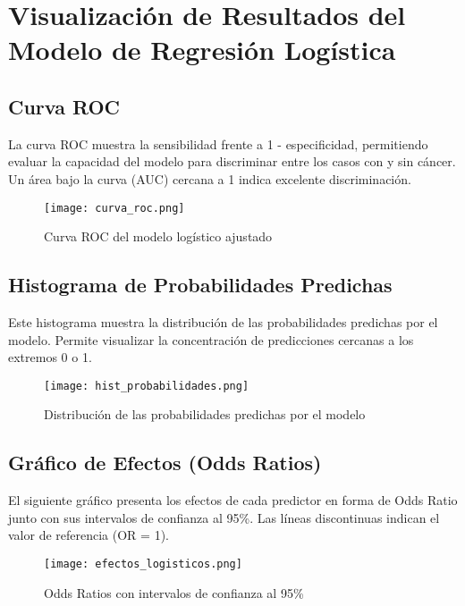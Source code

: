 
\section*{Visualización de Resultados del Modelo de Regresión Logística}

\subsection*{Curva ROC}
La curva ROC muestra la sensibilidad frente a 1 - especificidad, permitiendo evaluar la capacidad del modelo para discriminar entre los casos con y sin cáncer. Un área bajo la curva (AUC) cercana a 1 indica excelente discriminación.

\begin{figure}[h!]
\centering
\texttt{[image: curva\_roc.png]}
\caption{Curva ROC del modelo logístico ajustado}
\end{figure}

\subsection*{Histograma de Probabilidades Predichas}
Este histograma muestra la distribución de las probabilidades predichas por el modelo. Permite visualizar la concentración de predicciones cercanas a los extremos 0 o 1.

\begin{figure}[h!]
\centering
\texttt{[image: hist\_probabilidades.png]}
\caption{Distribución de las probabilidades predichas por el modelo}
\end{figure}

\subsection*{Gráfico de Efectos (Odds Ratios)}
El siguiente gráfico presenta los efectos de cada predictor en forma de Odds Ratio junto con sus intervalos de confianza al 95\%. Las líneas discontinuas indican el valor de referencia (OR = 1).

\begin{figure}[h!]
\centering
\texttt{[image: efectos\_logisticos.png]}
\caption{Odds Ratios con intervalos de confianza al 95\%}
\end{figure}
